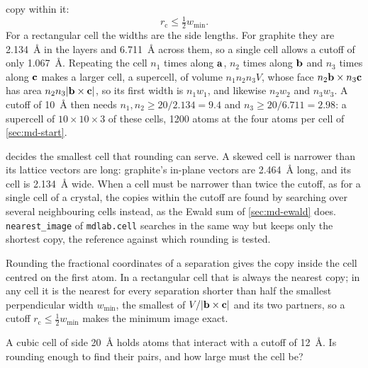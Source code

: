 copy within it:
\begin{equation}
   r_{\mathrm c} \le \tfrac12 w_{\min} .
   \label{eq:md-rule}
\end{equation}
For a rectangular cell the widths are the side lengths. For graphite they
are \SI{2.134}{\angstrom} in the layers and \SI{6.711}{\angstrom} across
them, so a single cell allows a cutoff of only \SI{1.067}{\angstrom}.
Repeating the cell $n_1$ times along $\bm{\mathrm{a}}$, $n_2$ times along $\bm{\mathrm{b}}$
and $n_3$ times along $\bm{\mathrm{c}}$ makes a larger cell, a supercell, of volume
$n_1n_2n_3V$, whose face $n_2\bm{\mathrm{b}}\times n_3\bm{\mathrm{c}}$ has area
$n_2n_3\lvert\bm{\mathrm{b}}\times\bm{\mathrm{c}}\rvert$, so its first width is $n_1w_1$,
and likewise $n_2w_2$ and $n_3w_3$. A cutoff of \SI{10}{\angstrom} then
needs $n_1, n_2 \ge 20/2.134 = 9.4$ and $n_3 \ge 20/6.711 = 2.98$: a
supercell of $10\times10\times3$ of these cells, 1200 atoms at the four
atoms per cell of \cref{sec:md-start}.

\begin{practice}
 decides the smallest cell that rounding can serve. A
skewed cell is narrower than its lattice vectors are long: graphite's
in-plane vectors are \SI{2.464}{\angstrom} long, and its cell is
\SI{2.134}{\angstrom} wide. When a cell must be narrower than twice the
cutoff, as for a single cell of a crystal, the copies within the cutoff
are found by searching over several neighbouring cells instead, as the
Ewald sum of \cref{sec:md-ewald} does. \texttt{nearest\_image} of
\texttt{mdlab.cell} searches in the same way but keeps only the shortest
copy, the reference against which rounding is tested.
\end{practice}

\begin{keyidea}
Rounding the fractional coordinates of a separation gives the copy inside
the cell centred on the first atom. In a rectangular cell that is always
the nearest copy; in any cell it is the nearest for every separation
shorter than half the smallest perpendicular width $w_{\min}$, the
smallest of $V/\lvert\bm{\mathrm{b}}\times\bm{\mathrm{c}}\rvert$ and its two partners, so
a cutoff $r_{\mathrm c} \le \frac12w_{\min}$ makes the minimum image
exact.
\end{keyidea}


\begin{selfcheck}
A cubic cell of side \SI{20}{\angstrom} holds atoms that interact with a
cutoff of \SI{12}{\angstrom}. Is rounding enough to find their pairs, and
how large must the cell be?
\end{selfcheck}
